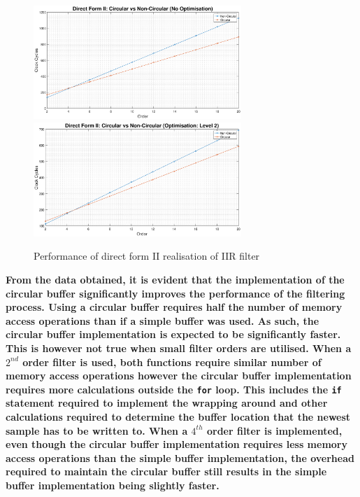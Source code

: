 \documentclass{article}
\begin{document}
\begin{figure}[H]
    \centering
    \includegraphics[width = 0.70\textwidth]{direct_form_2_no_opt}
    \includegraphics[width = 0.70\textwidth]{direct_form_2_opt}
    \caption{Performance of direct form II realisation of IIR filter}
    \label{fig:direct_form_2_performance}
\end{figure}


\textbf{From the data obtained, it is evident that the implementation of the circular buffer significantly improves the performance of the filtering process. Using a circular buffer requires half the number of memory access operations than if a simple buffer was used. As such, the circular buffer implementation is expected to be significantly faster.}\\

\textbf{This is however not true when small filter orders are utilised. When a $2^{nd}$ order filter is used, both functions require similar number of memory access operations however the circular buffer implementation requires more calculations outside the {\tt for} loop. This includes the {\tt if} statement required to implement the wrapping around and other calculations required to determine the buffer location that the newest sample has to be written to. When a $4^{th}$ order filter is implemented, even though the circular buffer implementation requires less memory access operations than the simple buffer implementation, the overhead required to maintain the circular buffer still results in the simple buffer implementation being slightly faster.} \\
\end{document}
